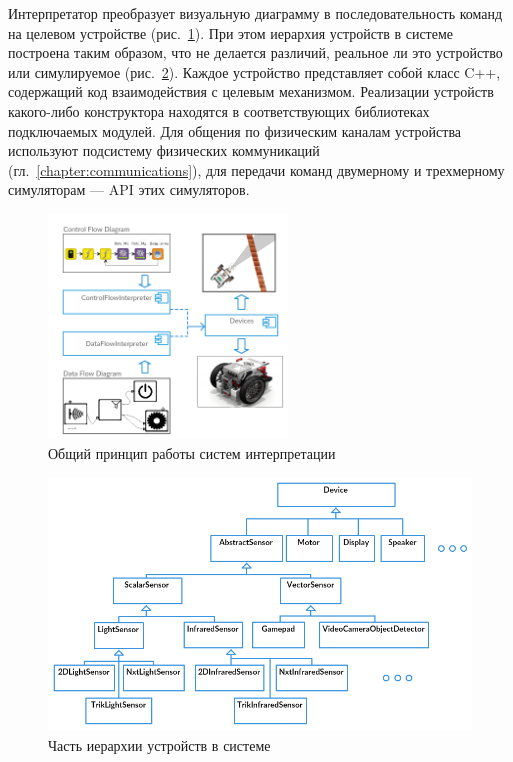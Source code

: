 \documentclass[a5paper]{article}
\begin{document}
Интерпретатор преобразует визуальную диаграмму в последовательность команд на целевом устройстве (рис.~\ref{image:interpretersTSArch}). При этом иерархия устройств в системе построена таким образом, что не делается различий, реальное ли это устройство или симулируемое (рис.~\ref{image:devicesTSArch}). Каждое устройство представляет собой класс C++, содержащий код взаимодействия с целевым механизмом. Реализации устройств какого-либо конструктора находятся в соответствующих библиотеках подключаемых модулей. Для общения по физическим каналам устройства используют подсистему физических коммуникаций (гл.~\ref{chapter:communications}), для передачи команд двумерному и трехмерному симуляторам --- API этих симуляторов.

\begin{figure}[ht]
    \centering
    \includegraphics[width=2.5in]{TS_Interpreter_Architecture.png}
    \caption{Общий принцип работы систем интерпретации}
    \label{image:interpretersTSArch}
\end{figure}

\begin{figure}[ht]
    \centering
    \includegraphics[width=4.5in]{TS_Devices_Architecture.png}
    \caption{Часть иерархии устройств в системе}
    \label{image:devicesTSArch}
\end{figure}
\end{document}
